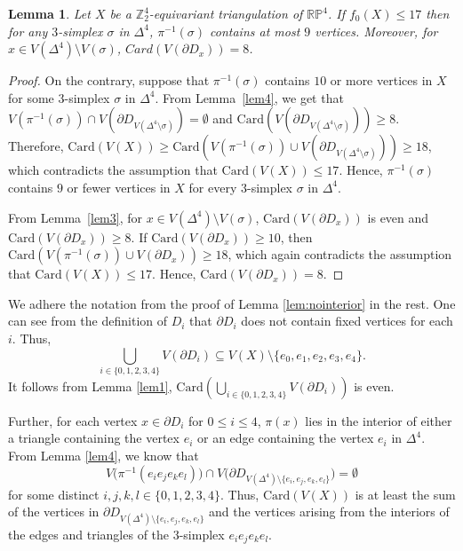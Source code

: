 \documentclass[11pt]{amsart}
\numberwithin{equation}{section}
\newtheorem{lemma}[theorem]{Lemma}
\theoremstyle{definition}
\newcommand{\RP}{\mathbb{RP}}
\newcommand{\D}{\Delta}
\def \bb{\mathbb}
\def \ZZ{{\bb{Z}}}
\begin{document}
\begin{lemma}\label{atmost9}
Let $X$ be a $\ZZ_2^4$-equivariant triangulation of $\RP^4$.  If $f_0(X)\leq 17$ then for any $3$-simplex $\sigma$ in $\D^4$, $\pi^{-1}(\sigma)$ contains at most $9$ vertices. Moreover, for $x\in V(\D^4)\setminus V(\sigma)$, $Card(V(\partial D_x))=8$. 
\end{lemma}

\begin{proof}
   On the contrary, suppose that $\pi^{-1}(\sigma)$ contains $10$ or more vertices in $X$ for some $3$-simplex $\sigma$ in $\D^4$. From Lemma~\ref{lem4}, we get that $V(\pi^{-1}(\sigma)) \cap V(\partial D_{V(\D^4 \setminus \sigma)}) = \emptyset$ and $\mathrm{Card}(V(\partial D_{V(\D^4 \setminus \sigma)})) \geq 8$. Therefore,
$\mathrm{Card}(V(X)) \geq \mathrm{Card}(V(\pi^{-1}(\sigma)) \cup V(\partial D_{V(\D^4 \setminus \sigma)})) \geq 18$, which contradicts the assumption that $\mathrm{Card}(V(X)) \leq 17$. Hence, $\pi^{-1}(\sigma)$ contains $9$ or fewer vertices in $X$ for every $3$-simplex $\sigma$ in $\D^4$.

From Lemma~\ref{lem3}, for $x \in V(\D^4) \setminus V(\sigma)$, $\mathrm{Card}(V(\partial D_x))$ is even and $\mathrm{Card}(V(\partial D_x)) \geq 8$. If $\mathrm{Card}(V(\partial D_x)) \geq 10$, then $\mathrm{Card}(V(\pi^{-1}(\sigma)) \cup V(\partial D_x)) \geq 18$, which again contradicts the assumption that $\mathrm{Card}(V(X)) \leq 17$. Hence, $\mathrm{Card}(V(\partial D_x)) = 8$.
\end{proof}




We adhere the notation from the proof of Lemma \ref{lem:nointerior} in the rest. One can see from the definition of $D_i$ that $\partial D_i$ does not contain fixed vertices for each $i$. Thus,
\[
\bigcup_{i \in \{0,1,2,3,4\}}V( \partial D_i) \subseteq V(X) \setminus \{e_0, e_1, e_2, e_3, e_4\}.
\]
 It follows from Lemma \ref{lem1}, $\mathrm{Card}\left(\bigcup_{i \in \{0,1,2,3,4\}}V( \partial D_i) \right )$ is even.

Further, for each vertex $x \in \partial D_i$ for $0\leq i\leq 4$, $\pi(x)$ lies in the interior of either a triangle containing the vertex $e_i$ or an edge containing the vertex $e_i$ in $\D^4$.  
From Lemma \ref{lem4}, we know that 
$$
V\big(\pi^{-1}(e_i e_j e_k e_l)\big) \cap V\big(\partial D_{V(\D^4) \setminus \{e_i, e_j, e_k, e_l\}}\big) = \emptyset$$
for some distinct $i, j, k, l \in \{0,1,2,3,4\}$.  
Thus, $\mathrm{Card}(V(X))$ is at least the sum of the vertices in $\partial D_{V(\D^4) \setminus \{e_i, e_j, e_k, e_l\}}$ and the vertices arising from the interiors of the edges and triangles of the $3$-simplex $e_i e_j e_k e_l$.
\end{document}
